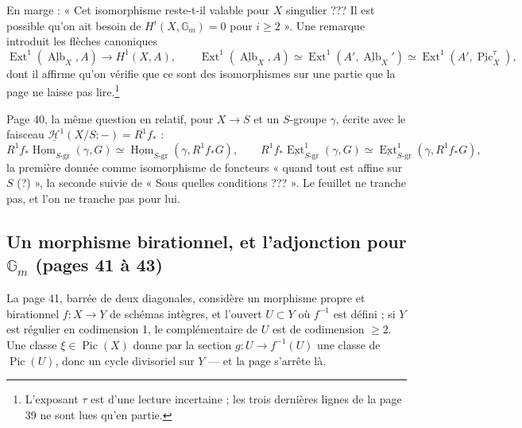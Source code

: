 \documentclass[11pt,a4paper]{article}
\begin{document}
En marge : « Cet isomorphisme reste-t-il valable pour $X$ singulier ??? Il est
possible qu'on ait besoin de $H^i(X, \mathbb{G}_m) = 0$ pour $i \geqslant 2$ ».
Une remarque introduit les flèches canoniques
\[ \operatorname{Ext}^1(\underline{\operatorname{Alb}}_X, A) \to H^1(X, A), \qquad
\operatorname{Ext}^1(\underline{\operatorname{Alb}}_X, A) \simeq
\operatorname{Ext}^1(A', \underline{\operatorname{Alb}}_X{}') \simeq
\operatorname{Ext}^1(A', \underline{\operatorname{Pic}}^{\tau}_X) , \]
dont il affirme qu'on vérifie que ce sont des isomorphismes sur une partie que la
page ne laisse pas lire.\footnote{L'exposant $\tau$ est d'une lecture incertaine ;
les trois dernières lignes de la page 39 ne sont lues qu'en partie.}

Page 40, la même question en relatif, pour $X \to S$ et un $S$-groupe
$\gamma$, écrite avec le faisceau $\underline{\mathcal{H}}^1(X/S; -) =
R^1f_*$ :
\[ R^1f_*\underline{\operatorname{Hom}}_{S\text{-gr}}(\gamma, G) \simeq
\underline{\operatorname{Hom}}_{S\text{-gr}}(\gamma, R^1f_*G), \qquad
R^1f_*\underline{\operatorname{Ext}}^1_{S\text{-gr}}(\gamma, G) \simeq
\underline{\operatorname{Ext}}^1_{S\text{-gr}}(\gamma, R^1f_*G) , \]
la première donnée comme isomorphisme de foncteurs « quand tout est affine sur
$S$ (?) », la seconde suivie de « Sous quelles conditions ??? ». Le feuillet ne
tranche pas, et l'on ne tranche pas pour lui.

\subsection*{Un morphisme birationnel, et l'adjonction pour $\mathbb{G}_m$ (pages 41 à 43)}

La page 41, barrée de deux diagonales, considère un morphisme propre et
birationnel $f\colon X \to Y$ de schémas intègres, et l'ouvert $U \subset Y$ où
$f^{-1}$ est défini ; si $Y$ est régulier en codimension 1, le complémentaire de
$U$ est de codimension $\geqslant 2$. Une classe $\xi \in \operatorname{Pic}(X)$
donne par la section $g\colon U \to f^{-1}(U)$ une classe de
$\operatorname{Pic}(U)$, donc un cycle divisoriel sur $Y$ --- et la page s'arrête
là.
\end{document}
